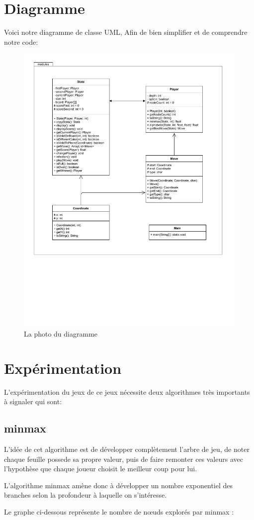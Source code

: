 \documentclass[11pt, pdflatex]{report}
\begin{document}
\section{Diagramme}
Voici notre diagramme de classe UML, Afin de bien simplifier et de comprendre notre code:
\begin{figure}[H]
    \centering
    \includegraphics[width=1\textwidth]{uml.pdf}
    \vspace{-12em}
    \caption{La photo du diagramme}
\end{figure}


\section{Expérimentation}
L’expérimentation du jeux de ce jeux nécessite deux algorithmes très importants à signaler qui sont: \par

\subsection{minmax}
L’idée de cet algorithme est de développer complètement l’arbre de jeu, de noter chaque feuille possede  sa propre valeur, puis de faire remonter ces valeurs avec l’hypothèse que chaque joueur choisit le meilleur coup pour lui. \par
L’algorithme minmax amène donc à développer un nombre exponentiel des branches selon la profondeur à laquelle on s’intéresse. \par
Le graphe ci-dessous représente le nombre de nœuds explorés par minmax :
\end{document}
